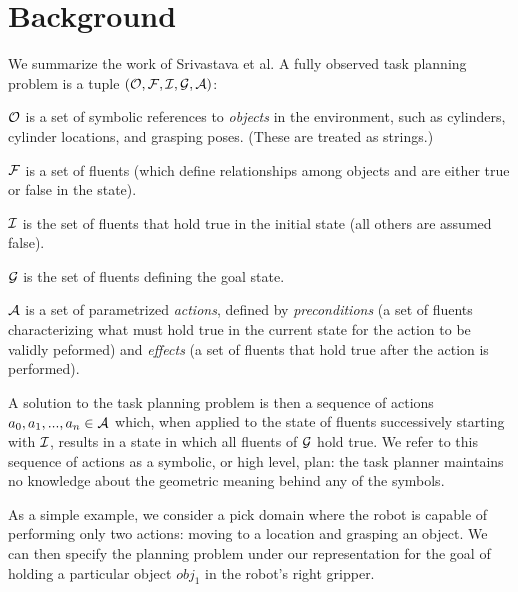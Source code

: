 \section{Background}
We summarize the work of Srivastava et al. A fully observed task planning
problem is a tuple $(\mathcal{O}, \mathcal{F}, \mathcal{I}, \mathcal{G}, \mathcal{A})$:

$\mathcal{O}$ is a set of symbolic references to \emph{objects} in the environment,
such as cylinders, cylinder locations, and grasping poses. (These are treated as strings.)

$\mathcal{F}$ is a set of fluents (which define relationships among objects and are either
true or false in the state).

$\mathcal{I}$ is the set of fluents that hold true in the initial state
(all others are assumed false).

$\mathcal{G}$ is the set of fluents defining the goal state.

$\mathcal{A}$ is a set of parametrized \emph{actions}, defined by \emph{preconditions} (a set
of fluents characterizing what must hold true in the current state for the action
to be validly peformed) and \emph{effects} (a set of fluents that hold true after
the action is performed).

A solution to the task planning problem is then a sequence of actions
$a_{0}, a_{1}, ..., a_{n} \in \mathcal{A}$ which, when applied to the state of fluents
successively starting with $\mathcal{I}$, results in a state in which all fluents of
$\mathcal{G}$ hold true. We refer to this sequence of actions as a symbolic, or
high level, plan: the task planner maintains no knowledge about the geometric meaning
behind any of the symbols.

As a simple example, we consider a pick domain where the robot is capable of
performing only two actions: moving to a location and grasping an object. We can
then specify the planning problem under our representation for the goal of holding
a particular object $obj_{1}$ in the robot's right gripper.

